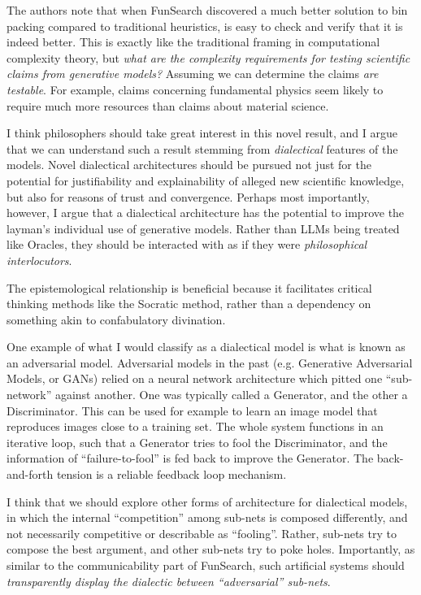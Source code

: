 \documentclass[11pt, oneside]{article}   	%
\begin{document}

The authors note that when FunSearch discovered a much better solution to bin packing compared to traditional heuristics, is easy to check and verify that it is indeed better.  This is exactly like the traditional framing in computational complexity theory, but \emph{what are the complexity requirements for testing scientific claims from generative models?}  Assuming we can determine the claims \emph{are testable}.  For example, claims concerning fundamental physics seem likely to require much more resources than claims about material science.

I think philosophers should take great interest in this novel result, and I argue that we can understand such a result stemming from \emph{dialectical} features of the models.  Novel dialectical architectures should be pursued not just for the potential for justifiability and explainability of alleged new scientific knowledge, but also for reasons of trust and convergence.  Perhaps most importantly, however, I argue that a dialectical architecture has the potential to improve the layman's individual use of generative models.  Rather than LLMs being treated like Oracles, they should be interacted with as if they were \emph{philosophical interlocutors}.  

The epistemological relationship is beneficial because it facilitates critical thinking methods like the Socratic method, rather than a dependency on something akin to confabulatory divination.  

One example of what I would classify as a dialectical model is what is known as an adversarial model. Adversarial models in the past (e.g. Generative Adversarial Models, or GANs) relied on a neural network architecture which pitted one ``sub-network'' against another.  One was typically called a Generator, and the other a Discriminator.  This can be used for example to learn an image model that reproduces images close to a training set.  The whole system functions in an iterative loop, such that a Generator tries to fool the Discriminator, and the information of ``failure-to-fool'' is fed back to improve the Generator.  The back-and-forth tension is a reliable feedback loop mechanism.

I think that we should explore other forms of architecture for dialectical models, in which the internal ``competition'' among sub-nets is composed differently, and not necessarily competitive or describable as ``fooling''.  Rather, sub-nets try to compose the best argument, and other sub-nets try to poke holes.  Importantly, as similar to the communicability part of FunSearch, such artificial systems should \emph{transparently display the dialectic between ``adversarial'' sub-nets}.  
\end{document}
